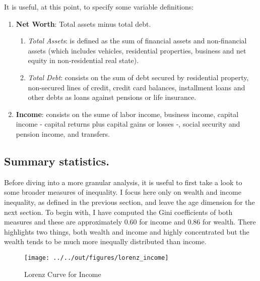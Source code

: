 \documentclass[11pt, a4paper, leqno]{article}
\begin{document}
It is useful, at this point, to specify some variable definitions:

\begin{enumerate}
    \item \textbf{Net Worth}: Total assets minus total debt.
    \begin{enumerate}
        \item \textit{Total Assets}: is defined as the sum of financial assets and non-financial assets (which includes vehicles, residential properties, business and net equity in non-residential real state).

        \item \textit{Total Debt}: consists on the sum of debt secured by residential property, non-secured lines of credit, credit card balances, installment loans and other debts as loans against pensions or life insurance.
    
    \end{enumerate}

    \item \textbf{Income}: consists on the sume of labor income, business income, capital income - capital returns plus capital gains or losses -, social security and pension income, and transfers.

\end{enumerate}

\subsection*{Summary statistics.}

Before diving into a more granular analysis, it is useful to first take a look to some broader measures of inequality. I focus here only on wealth and income inequality, as defined in the previous section, and leave the age dimension for the next section. To begin with, I have computed the Gini coefficients of both measures and these are approximately $0.60$ for income and $0.86$ for wealth. There highlights two things, both wealth and income and highly concentrated but the wealth tends to be much more inequally distributed than income.

\begin{figure}[H]
    \caption{Lorenz Curve for Income}
    
    \texttt{[image: ../../out/figures/lorenz\_income]}
    \label{fig:lorincome}
\end{figure}
\end{document}

